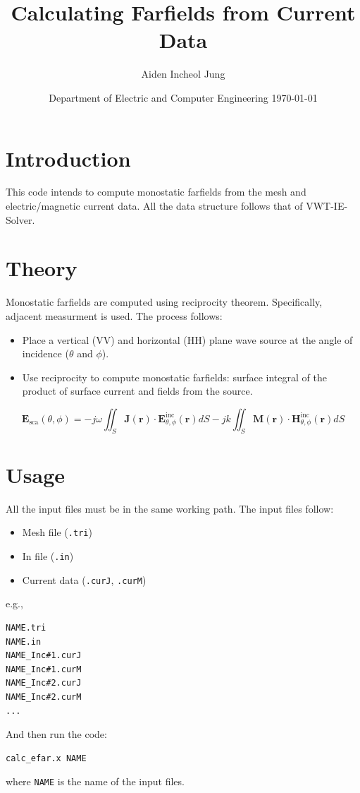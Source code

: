 \documentclass{article}
\title{Calculating Farfields from Current Data}
\author{Aiden Incheol Jung}
\date{
	Department of Electric and Computer Engineering
	\today
}
\begin{document}
\maketitle

\section{Introduction}
This code intends to compute monostatic farfields from the mesh and electric/magnetic current data. All the data structure follows that of VWT-IE-Solver.

\section{Theory}
Monostatic farfields are computed using reciprocity theorem. Specifically, adjacent measurment is used. The process follows:
\begin{itemize}
	\item Place a vertical (VV) and horizontal (HH) plane wave source at the angle of incidence ($\theta$ and $\phi$).
	\item Use reciprocity to compute monostatic farfields: surface integral of the product of surface current and fields from the source.
\end{itemize}
\[ \mathbf{E}_\mathrm{sca}(\theta, \phi) = - j\omega \iint_S {\mathbf{J}(\mathbf{r}) \cdot \mathbf{E}^\mathrm{inc}_{\theta,\phi}(\mathbf{r}) dS } - jk \iint_S {\mathbf{M}(\mathbf{r}) \cdot \mathbf{H}^\mathrm{inc}_{\theta,\phi}(\mathbf{r}) dS } \]

\section{Usage}
All the input files must be in the same working path. The input files follow:
\begin{itemize}
	\item Mesh file (\texttt{.tri})
	\item In file (\texttt{.in})
	\item Current data (\texttt{.curJ}, \texttt{.curM})
\end{itemize}
e.g., 
\begin{lstlisting}[]
NAME.tri
NAME.in
NAME_Inc#1.curJ
NAME_Inc#1.curM
NAME_Inc#2.curJ
NAME_Inc#2.curM
...
\end{lstlisting}

\noindent
And then run the code:
\begin{lstlisting}[language=bash]
calc_efar.x NAME
\end{lstlisting}
where \texttt{NAME} is the name of the input files.
\end{document}
